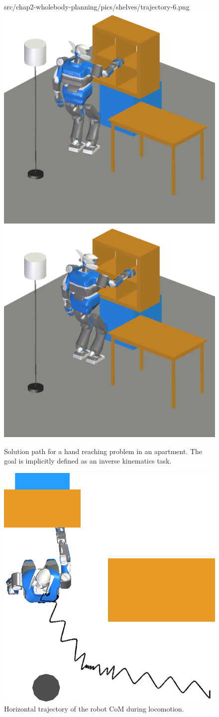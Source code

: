 \begin{figure}
                {src/chap2-wholebody-planning/pics/shelves/trajectory-6.png}
\includegraphics[width=0.24\linewidth]
                {src/chap2-wholebody-planning/pics/shelves/trajectory-7.png}
\includegraphics[width=0.24\linewidth]
                {src/chap2-wholebody-planning/pics/shelves/trajectory-8.png}

\caption{Solution path for a hand reaching problem in an
  apartment. The goal is implicitly defined as an inverse kinematics
  task.} 
\label{fig:shelf}
\end{figure}

\begin{figure}
\centering

\includegraphics[width=0.4\linewidth]
                {src/chap2-wholebody-planning/pics/shelves/waist-trajectory.png}

\caption{Horizontal trajectory of the robot CoM during
    locomotion.}
\label{fig:shelf-waist}
\end{figure}

